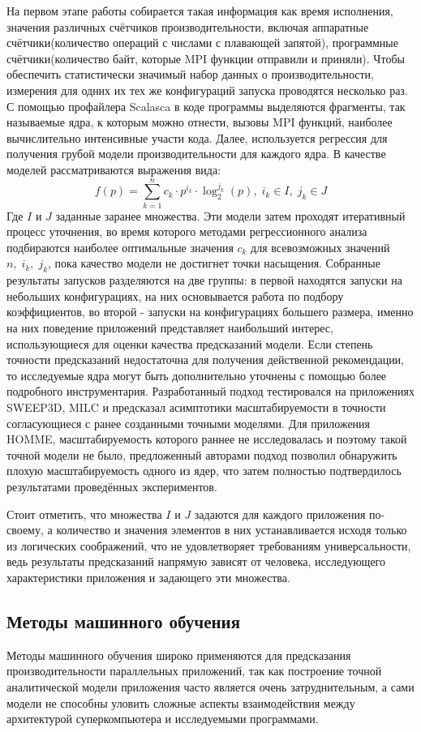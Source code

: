 		На первом этапе работы собирается такая информация как время исполнения, значения различных счётчиков производительности, включая аппаратные счётчики(количество операций с числами с плавающей запятой), программные счётчики(количество байт, которые MPI функции отправили и приняли). Чтобы обеспечить статистически значимый набор данных о производительности, измерения для одних их тех же конфигураций запуска проводятся несколько раз. С помощью профайлера Scalasca в коде программы выделяются фрагменты, так называемые ядра, к которым можно отнести, вызовы MPI функций, наиболее вычислительно интенсивные участи кода. Далее, используется регрессия для получения грубой модели производительности для каждого ядра. В качестве моделей рассматриваются выражения вида:
		\[
		f(p) = \sum \limits_{k=1}^{n} c_k \cdot p^{i_k} \cdot \log_2^{j_k}(p),\; i_k \in I,\; j_k \in J 
		\]
		Где \(I\) и \(J\) заданные заранее множества. Эти модели затем проходят итеративный процесс уточнения, во время которого методами регрессионного анализа подбираются наиболее оптимальные значения \(c_k\) для всевозможных значений \(n,\;i_{k},\;j_{k}\), пока качество модели не достигнет точки насыщения. Собранные результаты запусков разделяются на две группы: в первой находятся запуски на небольших конфигурациях, на них основывается работа по подбору коэффициентов, во второй - запуски на конфигурациях большего размера, именно на них поведение приложений представляет наибольший интерес, использующиеся для оценки качества предсказаний модели. Если степень точности предсказаний недостаточна для получения действенной рекомендации, то исследуемые ядра могут быть дополнительно уточнены с помощью более подробного инструментария. Разработанный подход тестировался на приложениях SWEEP3D, MILC и предсказал асимптотики масштабируемости в точности согласующиеся с ранее созданными точными моделями. Для приложения HOMME, масштабируемость которого раннее не исследовалась и поэтому такой точной модели не было, предложенный авторами подход позволил обнаружить плохую масштабируемость одного из ядер, что затем полностью подтвердилось результатами проведённых экспериментов.

		Стоит отметить, что множества \(I\) и \(J\) задаются для каждого приложения по-своему, а количество и значения элементов в них устанавливается исходя только из логических соображений, что не удовлетворяет требованиям универсальности, ведь результаты предсказаний напрямую зависят от человека, исследующего характеристики приложения и задающего эти множества.


	\subsection{Методы машинного обучения}
		Методы машинного обучения широко применяются для предсказания производительности параллельных приложений, так как построение точной аналитической модели приложения часто является очень затруднительным, а сами модели не способны уловить сложные аспекты взаимодействия между архитектурой суперкомпьютера и исследуемыми программами.

